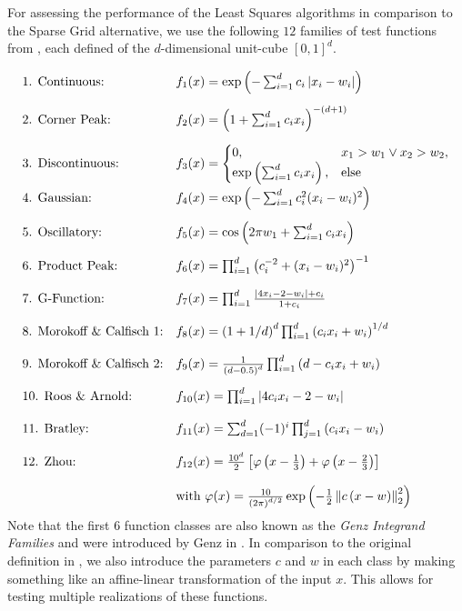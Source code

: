 \documentclass[12pt, oneside]{amsart}
\theoremstyle{definition}
\theoremstyle{remark}
\numberwithin{equation}{section}
\begin{document}
For assessing the performance of the Least Squares algorithms in comparison to 
the Sparse Grid alternative, we use the following $12$ families of test 
functions from \cite{Simulationlib_2013}, each defined of the $d$-dimensional 
unit-cube $[0,1]^d$.

{
	\allowdisplaybreaks[4]
	\begin{align*}
		\begin{array}{l l}
			\text{1. Continuous:} & f_1(x) = \exp\left( - 
			\sum_{i=1}^{d} c_i \abs{x_i - w_i} \right) \\[12pt]
			\text{2. Corner Peak:} & f_2(x) = \left( 1 + 
			\sum_{i=1}^{d} c_i x_i 
			\right)^{-(d+1)} \\[12pt]
			\text{3. Discontinuous:} & f_3(x) = 
			\begin{cases}
				0, &x_1 > w_1 \lor x_2 > w_2, \\
				\exp\left( \sum_{i=1}^{d} c_i x_i \right), & 
				\text{else}
			\end{cases} \\[12pt]
			\text{4. Gaussian:} & f_4(x) = \exp\left( - 
			\sum_{i=1}^{d} c_i^2 (x_i 
			- w_i)^2 \right) \\[12pt]
			\text{5. Oscillatory:} & f_5(x) = \cos\left( 2\pi w_1 + 
			\sum_{i=1}^{d} c_i x_i \right) \\[12pt]
			\text{6. Product Peak:} & f_6(x) = \prod_{i=1}^{d} 
			\left( c_i^{-2} + (x_i - w_i)^2 \right)^{-1} \\[12pt]
			\text{7. G-Function:} & f_7(x) = \prod_{i=1}^{d}
			\frac{\abs{4x_i-2-w_i}+c_i}{1+c_i}
					\\[12pt]
			\text{8. Morokoff \& Calfisch 1:} & f_8(x) = 
			\left(1+1/d\right)^d  
			\prod_{i=1}^{d}\left(c_ix_i+w_i\right)^{1/d}
			\\[12pt]
			\text{9. Morokoff \& Calfisch 2:} & f_9(x) = 
			\frac{1}{\left(d-0.5\right)^d} 
			\prod_{i=1}^{d}\left(d-c_ix_i+w_i\right)
			\\[12pt]
			\text{10. Roos \& Arnold:} & f_{10}(x) = \prod_{i=1}^{d} 
			\abs{4c_ix_i-2-w_i}
			\\[12pt]
			\text{11. Bratley:} & f_{11}(x) = 
			\sum_{d=1}^{d}(-1)^{i}\prod_{j=1}^{d} \left(c_ix_i-w_i\right)
			\\[12pt]
			\text{12. Zhou:} & f_{12}(x) = \frac{10^d}{2} 
			\left[\phi\left(x-\frac13\right)+\phi\left(x-\frac23\right)\right] 
			\\[12pt]
			& \text{with }\phi(x) = 
			\frac{10}{\left(2\pi\right)^{d/2}} 
			\exp \left(-\frac{1}{2}\norm[2]{c\left(x-w\right)}^2\right)
		\end{array}
	\end{align*}
}
Note that the first $6$ function classes are also known as the \emph{Genz 
Integrand Families} and were introduced by Genz in \cite{GenzTesting_1984, 
GenzPackage_1987}. In comparison to the original definition in 
\cite{Simulationlib_2013}, we also introduce the parameters $c$ and $w$ in 
each class by making something like an affine-linear transformation of the 
input $x$. 
This allows for testing multiple realizations of these functions.
\end{document}
